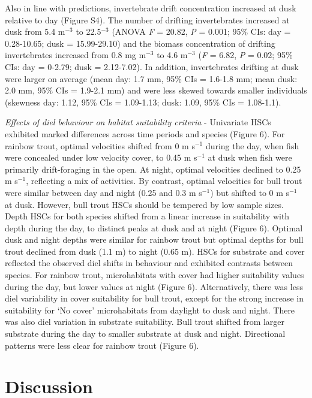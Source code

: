 \documentclass[]{article}
\begin{document}
Also in line with predictions, invertebrate drift concentration
increased at dusk relative to day (Figure S4). The number of drifting
invertebrates increased at dusk from 5.4 m\(^{-3}\) to 22.5\(^{-3}\)
(ANOVA \emph{F} = 20.82, \emph{P} = 0.001; 95\% CIs: day = 0.28-10.65;
dusk = 15.99-29.10) and the biomass concentration of drifting
invertebrates increased from 0.8 mg m\(^{-3}\) to 4.6 m\(^{-3}\)
(\emph{F} = 6.82, \emph{P} = 0.02; 95\% CIs: day = 0-2.79; dusk =
2.12-7.02). In addition, invertebrates drifting at dusk were larger on
average (mean day: 1.7 mm, 95\% CIs = 1.6-1.8 mm; mean dusk: 2.0 mm,
95\% CIs = 1.9-2.1 mm) and were less skewed towards smaller individuals
(skewness day: 1.12, 95\% CIs = 1.09-1.13; dusk: 1.09, 95\% CIs =
1.08-1.1).

\emph{Effects of diel behaviour on habitat suitability criteria} -
Univariate HSCs exhibited marked differences across time periods and
species (Figure 6). For rainbow trout, optimal velocities shifted from 0
m s\(^{-1}\) during the day, when fish were concealed under low velocity
cover, to 0.45 m s\(^{-1}\) at dusk when fish were primarily
drift-foraging in the open. At night, optimal velocities declined to
0.25 m s\(^{-1}\), reflecting a mix of activities. By contrast, optimal
velocities for bull trout were similar between day and night (0.25 and
0.3 m s\(^{-1}\)) but shifted to 0 m s\(^{-1}\) at dusk. However, bull
trout HSCs should be tempered by low sample sizes. Depth HSCs for both
species shifted from a linear increase in suitability with depth during
the day, to distinct peaks at dusk and at night (Figure 6). Optimal dusk
and night depths were similar for rainbow trout but optimal depths for
bull trout declined from dusk (1.1 m) to night (0.65 m). HSCs for
substrate and cover reflected the observed diel shifts in behaviour and
exhibited contrasts between species. For rainbow trout, microhabitats
with cover had higher suitability values during the day, but lower
values at night (Figure 6). Alternatively, there was less diel
variability in cover suitability for bull trout, except for the strong
increase in suitability for `No cover' microhabitats from daylight to
dusk and night. There was also diel variation in substrate suitability.
Bull trout shifted from larger substrate during the day to smaller
substrate at dusk and night. Directional patterns were less clear for
rainbow trout (Figure 6).

\section{Discussion}\label{discussion}
\end{document}
